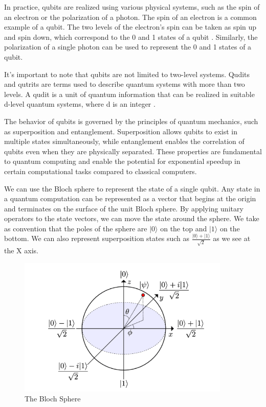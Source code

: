\documentclass[inscr,ack,preface]{diphdthesis}
\begin{document}
In practice, qubits are realized using various physical systems, such as the spin of an electron or the polarization of a photon. The spin of an electron is a common example of a qubit. The two levels of the electron's spin can be taken as spin up and spin down, which correspond to the 0 and 1 states of a qubit \cite{electron}. Similarly, the polarization of a single photon can be used to represent the 0 and 1 states of a qubit.

It's important to note that qubits are not limited to two-level systems. Qudits and qutrits are terms used to describe quantum systems with more than two levels. A qudit is a unit of quantum information that can be realized in suitable d-level quantum systems, where d is an integer \cite{qudit}.

The behavior of qubits is governed by the principles of quantum mechanics, such as superposition and entanglement. Superposition allows qubits to exist in multiple states simultaneously, while entanglement enables the correlation of qubits even when they are physically separated. These properties are fundamental to quantum computing and enable the potential for exponential speedup in certain computational tasks compared to classical computers.

We can use the Bloch sphere to represent the state of a single qubit. Any
state in a quantum computation can be represented as a vector that begins at
the origin and terminates on the surface of the unit Bloch sphere. By applying
unitary operators to the state vectors, we can move the state around the sphere.
We take as convention that the poles of the sphere are $\vert0\rangle$ on the top and $\vert1\rangle$ on the bottom. \cite{hidary}
We can also represent superposition states such as 
\Large $\frac{\lvert 0 \rangle + \lvert 1 \rangle}{\sqrt{2}}$ 
\normalsize as we see at the X axis.
\begin{figure}[ht]
    \includegraphics[width=0.9\textwidth]{bloch.png}
    \caption{The Bloch Sphere}
    \label{fig:enter-label}
\end{figure}
\end{document}
